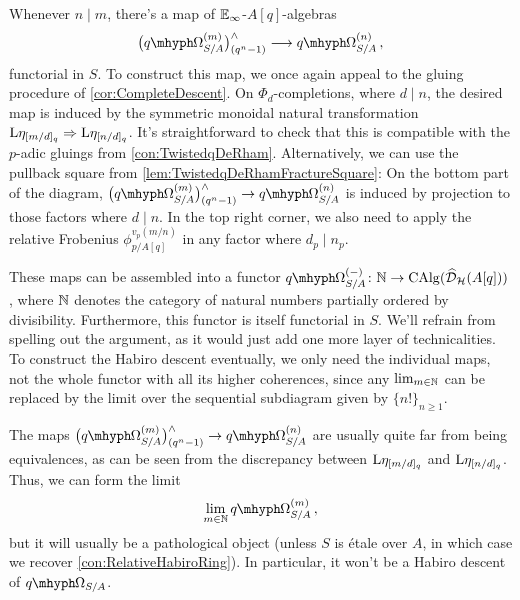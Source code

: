 \documentclass[DIV=12,numbers=enddot,leqno,bibliography=totoc]{scrartcl}
\begin{document}
	\begin{numpar}\label{con:TwistedqDeRhamFunctoriality}
		Whenever $n\mid m$, there's a map of $\mathbb{E}_\infty$-$A[q]$-algebras
		\begin{equation*}
			\bigl(\qOmega_{S/A}^{(m)}\bigr)_{(q^n-1)}^\complete\longrightarrow \qOmega_{S/A}^{(n)}\,,
		\end{equation*}
		functorial in $S$. To construct this map, we once again appeal to the gluing procedure of \cref{cor:CompleteDescent}. On $\Phi_{d}$-completions, where $d\mid n$, the desired map is induced by the symmetric monoidal natural transformation $\mathrm{L}\eta_{[m/d]_q}\Rightarrow \mathrm{L}\eta_{[n/d]_q}$. It's straightforward to check that this is compatible with the $p$-adic gluings from \cref{con:TwistedqDeRham}. Alternatively, we can use the pullback square from \cref{lem:TwistedqDeRhamFractureSquare}: On the bottom part of the diagram, $\bigl(\qOmega_{S/A}^{(m)}\bigr)_{(q^n-1)}^\complete\rightarrow \qOmega_{S/A}^{(n)}$ is induced by projection to those factors where $d\mid n$. In the top right corner, we also need to apply the relative Frobenius $\phi_{p/A[q]}^{v_p(m/n)}$ in any factor where $d_p\mid n_p$.
		
		These maps can be assembled into a functor $\qOmega_{S/A}^{(-)}\colon \IN\rightarrow \CAlg(\widehat{\Dd}_\Hh(A[q]))$, where $\mathbb{N}$ denotes the category of natural numbers partially ordered by divisibility. Furthermore, this functor is itself functorial in $S$. We'll refrain from spelling out the argument, as it would just add one more layer of technicalities. To construct the Habiro descent eventually, we only need the individual maps, not the whole functor with all its higher coherences, since any $\operatorname*{lim}_{m\in\mathbb{N}}$ can be replaced by the limit over the sequential subdiagram given by $\{n!\}_{n\geqslant 1}$.
	\end{numpar}
	\begin{rem}
		The maps $\bigl(\qOmega_{S/A}^{(m)}\bigr)_{(q^n-1)}^\complete\rightarrow \qOmega_{S/A}^{(n)}$ are usually quite far from being equivalences, as can be seen from the discrepancy between $\mathrm{L}\eta_{[m/d]_q}$ and $\mathrm{L}\eta_{[n/d]_q}$. Thus, we can form the limit
		\begin{equation*}
			\limit_{m\in\IN}\qOmega_{S/A}^{(m)}\,,
		\end{equation*}
		but it will usually be a pathological object (unless $S$ is étale over $A$, in which case we recover \cref{con:RelativeHabiroRing}). In particular, it won't be a Habiro descent of $\qOmega_{S/A}$.
	\end{rem}
\end{document}
